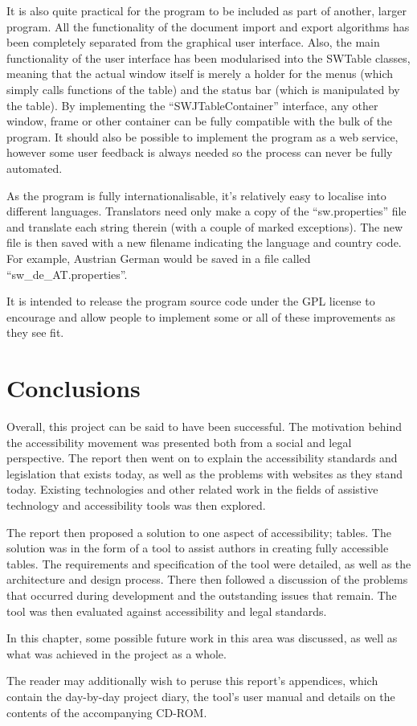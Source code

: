 It is also quite practical for the program to be included as part of another,
larger program. All the functionality of the document import and export
algorithms has been completely separated from the graphical user interface.
Also, the main functionality of the user interface has been modularised into
the SWTable classes, meaning that the actual window itself is merely a holder
for the menus (which simply calls functions of the table) and the status bar
(which is manipulated by the table). By implementing the ``SWJTableContainer''
interface, any other window, frame or other container can be fully compatible
with the bulk of the program. It should also be possible to implement the
program as a web service, however some user feedback is always needed so the 
process can never be fully automated.

As the program is fully internationalisable, it's relatively easy to localise
into different languages. Translators need only make a copy of the
``sw.properties'' file and translate each string therein (with a
couple of marked exceptions). The new file is then saved with a new filename
indicating the language and country code. For example, Austrian German
would be saved in a file called ``sw\_de\_AT.properties''.

It is intended to release the program source code under the GPL\cite{gpl} 
license to encourage and allow people to implement some or all of these
improvements as they see fit.

\section{Conclusions}

Overall, this project can be said to have been successful. The motivation
behind the accessibility movement was presented both from a social and legal
perspective. The report then went on to explain the accessibility standards and
legislation that exists today, as well as the problems with websites as they
stand today. Existing technologies and other related work in the fields of
assistive technology and accessibility tools was then explored.

The report then proposed a solution to one aspect of accessibility; tables. The
solution was in the form of a tool to assist authors in creating fully
accessible tables. The requirements and specification of the tool were
detailed, as well as the architecture and design process. There then followed a
discussion of the problems that occurred during development and the outstanding
issues that remain. The tool was then evaluated against accessibility and legal
standards.

In this chapter, some possible future work in this area was discussed, as well
as what was achieved in the project as a whole.

The reader may additionally wish to peruse this report's appendices, which contain
the day-by-day project diary, the tool's user manual and details on the contents
of the accompanying CD-ROM.
